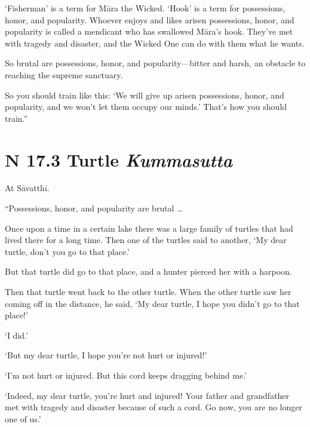 \documentclass[12pt,openany]{book}%
\newcommand*{\suttatitleacronym}[1]{\smaller[2]{#1}\vspace*{.3em}}
\newcommand*{\suttatitletranslation}[1]{\linebreak{#1}}
\newcommand*{\suttatitleroot}[1]{\linebreak\smaller[2]\itshape{#1}}
\newcommand*{\tocacronym}[1]{\hspace*{-3.3em}{#1}\quad}
\newcommand*{\toctranslation}[1]{#1}
\newcommand*{\tocroot}[1]{(\textit{#1})}
\begin{document}
‘Fisherman’ is a term for \textsanskrit{Māra} the Wicked. ‘Hook’ is a term for possessions, honor, and popularity. Whoever enjoys and likes arisen possessions, honor, and popularity is called a mendicant who has swallowed \textsanskrit{Māra}’s hook. They’ve met with tragedy and disaster, and the Wicked One can do with them what he wants. 

So brutal are possessions, honor, and popularity—bitter and harsh, an obstacle to reaching the supreme sanctuary. 

So you should train like this: ‘We will give up arisen possessions, honor, and popularity, and we won’t let them occupy our minds.’ That’s how you should train.” 

%
\section*{{\suttatitleacronym SN 17.3}{\suttatitletranslation A Turtle }{\suttatitleroot Kummasutta}}
\addcontentsline{toc}{section}{\tocacronym{SN 17.3} \toctranslation{A Turtle } \tocroot{Kummasutta}}

At \textsanskrit{Sāvatthī}. 

“Possessions, honor, and popularity are brutal … 

Once upon a time in a certain lake there was a large family of turtles that had lived there for a long time. Then one of the turtles said to another, ‘My dear turtle, don’t you go to that place.’ 

But that turtle did go to that place, and a hunter pierced her with a harpoon. 

Then that turtle went back to the other turtle. When the other turtle saw her coming off in the distance, he said, ‘My dear turtle, I hope you didn’t go to that place!’ 

‘I did.’ 

‘But my dear turtle, I hope you’re not hurt or injured!’ 

‘I’m not hurt or injured. But this cord keeps dragging behind me.’ 

‘Indeed, my dear turtle, you’re hurt and injured! Your father and grandfather met with tragedy and disaster because of such a cord. Go now, you are no longer one of us.’ 
\end{document}

